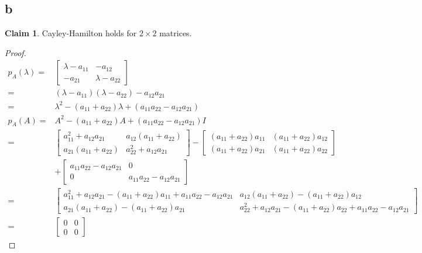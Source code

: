 \documentclass[12pt,letterpaper]{article}
\theoremstyle{definition}
\newtheorem*{claim}{Claim}
\begin{document}
\subsection*{b}

\begin{claim}
  Cayley-Hamilton holds for $2 \times 2$ matrices.
\end{claim}

\begin{proof}
  \begin{align*}
    p_A(\lambda) =& 
                   \begin{bmatrix}
                     \lambda - a_{11} & -a_{12} \\
                     -a_{21} & \lambda - a_{22} 
                   \end{bmatrix}\\
                 =& (\lambda - a_{11})(\lambda - a_{22}) - a_{12}a_{21} \\
                 =& \lambda^2 - (a_{11} + a_{22}) \lambda + (a_{11}a_{22} - a_{12}a_{21}) \\
    p_A(A) =& A^2 - (a_{11} + a_{22}) A + (a_{11}a_{22} - a_{12}a_{21}) I \\
                 =&
                   \begin{bmatrix}
                     a_{11}^2 + a_{12}a_{21} & a_{12}(a_{11} + a_{22}) \\
                     a_{21}(a_{11} + a_{22}) & a_{22}^2 + a_{12}a_{21}
                   \end{bmatrix} -
                                               \begin{bmatrix}
                                                 (a_{11} + a_{22})a_{11} & (a_{11} + a_{22})a_{12} \\
                                                 (a_{11} + a_{22})a_{21} & (a_{11} + a_{22})a_{22}
                                               \end{bmatrix} \\
    &+
    \begin{bmatrix}
      a_{11}a_{22} - a_{12}a_{21} & 0 \\
      0 &  a_{11}a_{22} - a_{12}a_{21}
    \end{bmatrix} \\
                 =&
                   \begin{bmatrix}
                     a_{11}^2 + a_{12}a_{21} - (a_{11} + a_{22})a_{11} +  a_{11}a_{22} - a_{12}a_{21} & a_{12}(a_{11} + a_{22}) - (a_{11} + a_{22})a_{12}\\
                     a_{21}(a_{11} + a_{22}) - (a_{11} + a_{22})a_{21}  & a_{22}^2 + a_{12}a_{21} - (a_{11} + a_{22})a_{22} + a_{11}a_{22} - a_{12}a_{21}
                   \end{bmatrix} \\
                 =&
                   \begin{bmatrix}
                     0 & 0\\
                     0 & 0 
                   \end{bmatrix}
  \end{align*}
\end{proof}
\end{document}
